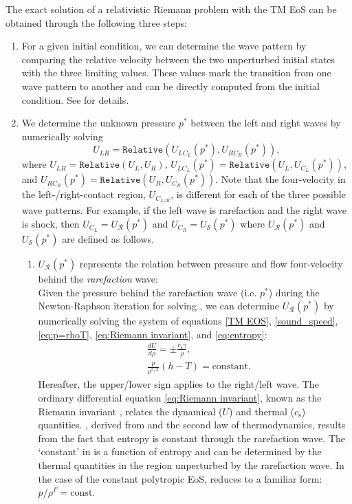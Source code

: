 \documentclass[twocolumn]{aastex63}
\begin{document}
The exact solution of a relativistic Riemann problem with the TM EoS can be obtained through the following three steps:
\begin{enumerate}
    \item For a given initial condition, we can determine the wave pattern by comparing the relative velocity between the two unperturbed initial states with the three limiting values. These values mark the transition from one wave pattern to another and can be directly computed from the initial condition. See \citet{REZZOLLA2001} for details.
    \item We determine the unknown pressure $p^{*}$ between the left and right waves by numerically solving
    \begin{equation}
    U_{LR}=\texttt{Relative}(U_{LC_{L}}(p^{*}), U_{RC_{R}}(p^{*})),
    \label{eq:p*}
    \end{equation}
    where $U_{LR}=\texttt{Relative}(U_{L}, U_{R})$, $U_{LC_{L}}(p^{*})=\texttt{Relative}(U_{L}, U_{C_{L}}(p^{*}))$, and $U_{RC_{R}}(p^{*})=\texttt{Relative}(U_{R}, U_{C_{R}}(p^{*}))$. Note that the four-velocity in the left-/right-contact region, $U_{C_{L/R}}$, is different for each of the three possible wave patterns. For example, if the left wave is rarefaction and the right wave is shock, then $U_{C_{L}}=U_{\mathscr{R}}(p^*)$ and $U_{C_{R}}=U_{\mathscr{S}}(p^*)$ where $U_{\mathscr{R}}(p^*)$ and $U_{\mathscr{S}}(p^*)$ are defined as follows.
          \begin{enumerate}
          \item $U_{\mathscr{R}}(p^*)$ represents the relation between pressure and flow four-velocity behind the \emph{rarefaction} wave:\\
          Given the pressure behind the rarefaction wave (i.e. $p^{*}$) during the Newton-Raphson iteration for solving , we can determine $U_{\mathscr{R}}(p^*)$ by numerically solving the system of equations \eqref{TM EOS}, \eqref{sound_speed}, \eqref{eq:p=rhoT}, \eqref{eq:Riemann invariant}, and \eqref{eq:entropy}:
          \begin{subequations}
          \begin{align}
          &\frac{dU}{d\rho}=\pm \frac{c_{\text{s}}\gamma}{\rho},\label{eq:Riemann invariant}\\
          &\frac{p}{\rho^{5/3}}(h-T)=\text{constant}.\label{eq:entropy}
          \end{align}
          \label{eq: U behind r wave}
          \end{subequations}
          Hereafter, the upper/lower sign applies to the right/left wave. The ordinary differential equation \eqref{eq:Riemann invariant}, known as the Riemann invariant \citep{Rezzolla2018}, relates the dynamical ($U$) and thermal ($c_{\text{s}}$) quantities. , derived from  and the second law of thermodynamics, results from the fact that entropy is constant through the rarefaction wave. The `constant' in  is a function of entropy and can be determined by the thermal quantities in the region unperturbed by the rarefaction wave. In the case of the constant polytropic EoS,  reduces to a familiar form: $p/\rho^{\Gamma}=\text{const}$.


\end{enumerate}
\end{enumerate}
\end{document}
